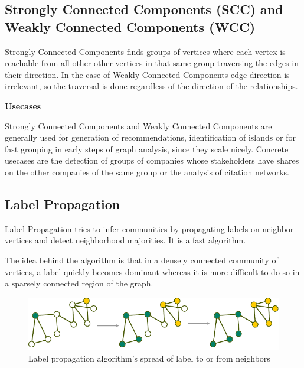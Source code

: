 \subsection[Strongly Connected Components (SCC) and Weakly Connected Components (WCC)]{\gls{Strongly Connected Components} (\acrshort{SCC}) and \gls{Weakly Connected Components} (\acrshort{WCC})} \label{subsection:CommunityDetection/Clusteringmethodologies/StronglyConnectedComponentsSCCandWeaklyConnectedComponentsWCC}
\gls{Strongly Connected Components} finds groups of vertices where each vertex is reachable from all other other vertices in that same group traversing the edges in their direction. In the case of \gls{Weakly Connected Components} edge direction is irrelevant, so the traversal is done regardless of the direction of the relationships.
\medskip

\noindent\textbf{Usecases}

\gls{Strongly Connected Components} and \gls{Weakly Connected Components} are generally used for generation of \gls{recommendation}s, identification of islands or for fast grouping in early steps of \gls{graph analysis}, since they scale nicely. Concrete usecases are the detection of groups of companies whose stakeholders have shares on the other companies of the same group or the analysis of citation networks.

\subsection[Label Propagation]{\gls{Label Propagation}} \label{subsection:CommunityDetection/Clusteringmethodologies/LabelPropagation}
\gls{Label Propagation} tries to infer communities by propagating labels on neighbor vertices and detect neighborhood majorities. It is a fast algorithm.

The idea behind the algorithm is that in a densely connected community of vertices, a label quickly becomes dominant whereas it is more difficult to do so in a sparsely connected region of the graph.

\begin{figure}[H]%
	\centering%
	\includegraphics[width=1\textwidth]{images/chapter3/labelpropagation.pdf}%
	\caption[Label propagation algorithm's spread of label to or from neighbors]{Label propagation algorithm's spread of label to or from neighbors}%
	\label{fig:labelpropagation}%
\end{figure}%

